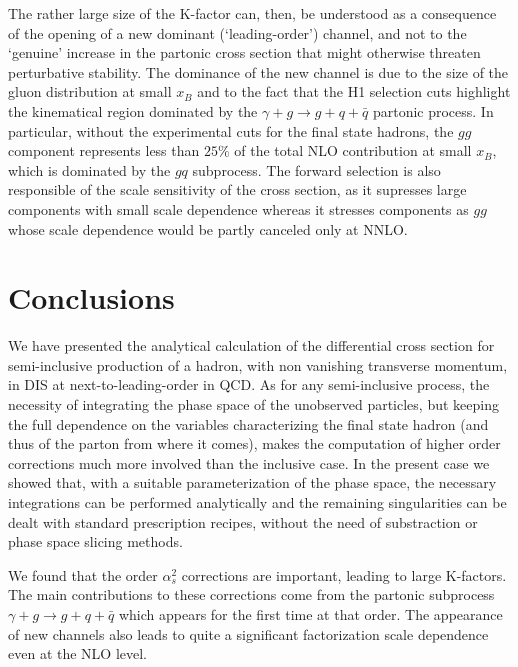 \documentclass[superscriptaddress,showkeys,showpacs]{revtex4}
\begin{document}
The rather large size of the K-factor can, then, be understood  
as a consequence of the opening of a new dominant (`leading-order') channel,
 and not to the `genuine' increase in the partonic cross 
section that might otherwise threaten perturbative stability. The dominance of
the new channel is due to the size of the gluon distribution 
at small $x_B$ and to the fact that the H1 selection cuts highlight
the kinematical  region dominated by the $\gamma+g\rightarrow g+q+\bar{q}$ 
partonic process. In particular, without the experimental cuts for the final 
state hadrons, the $gg$ component represents less than $25\%$ of the total 
NLO contribution at small $x_B$, which is dominated by the $gq$ subprocess.
%
%
The forward selection is also responsible of the scale sensitivity of the
cross section, as it supresses large components  with small scale
dependence whereas it stresses components as $gg$ whose scale dependence would
be partly canceled only at NNLO.


 



    

\section{Conclusions}

We have presented the analytical calculation of the differential cross section
for semi-inclusive production of a hadron, with non vanishing transverse 
momentum, in DIS at next-to-leading-order in QCD.  
As for any semi-inclusive process, the necessity of integrating the phase 
space of the unobserved particles, but keeping the full dependence on the 
variables characterizing the final state hadron (and thus of the parton from 
where it comes), makes the computation of higher order corrections much more 
involved than the inclusive case. In the present case we showed that, with a 
suitable parameterization of the phase space, the necessary integrations can be 
performed analytically and the remaining singularities can be dealt with 
standard prescription recipes, without the need of substraction or phase space 
slicing methods.

We found that the order $\alpha_s^2$ corrections are important, leading to 
large K-factors. The main contributions to these corrections come from 
the partonic subprocess $ \gamma + g \rightarrow g+q+\bar{q}$ which appears
for the first time at that order. The appearance of new channels
also leads to quite a significant factorization scale dependence even at the 
NLO level. 
\end{document}
